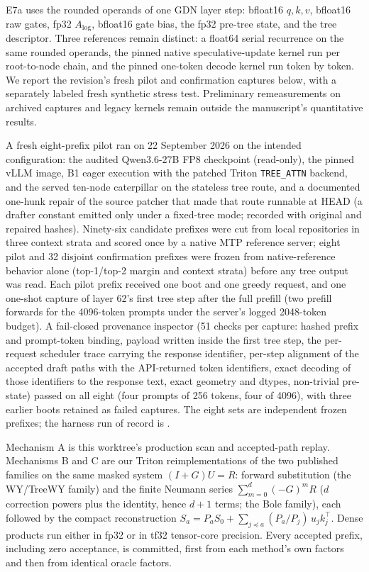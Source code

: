 \documentclass[conference]{IEEEtran}
\begin{document}
E7a uses the rounded operands of one GDN layer step: bfloat16 $q,k,v$, bfloat16 raw gates, fp32 $A_{\log}$, bfloat16 gate bias, the fp32 pre-tree state, and the tree descriptor. Three references remain distinct: a float64 serial recurrence on the same rounded operands, the pinned native speculative-update kernel run per root-to-node chain, and the pinned one-token decode kernel run token by token. We report the revision's fresh pilot and confirmation captures below, with a separately labeled fresh synthetic stress test. Preliminary remeasurements on archived captures and legacy kernels remain outside the manuscript's quantitative results.

A fresh eight-prefix pilot ran on 22 September 2026 on the intended configuration: the audited Qwen3.6-27B FP8 checkpoint (read-only), the pinned vLLM image, B1 eager execution with the patched Triton \texttt{TREE\_ATTN} backend, and the served ten-node caterpillar on the stateless tree route, and a documented one-hunk repair of the source patcher that made that route runnable at HEAD (a drafter constant emitted only under a fixed-tree mode; recorded with original and repaired hashes). Ninety-six candidate prefixes were cut from local repositories in three context strata and scored once by a native MTP reference server; eight pilot and 32 disjoint confirmation prefixes were frozen from native-reference behavior alone (top-1/top-2 margin and context strata) before any tree output was read. Each pilot prefix received one boot and one greedy request, and one one-shot capture of layer 62's first tree step after the full prefill (two prefill forwards for the 4096-token prompts under the server's logged 2048-token budget). A fail-closed provenance inspector (51 checks per capture: hashed prefix and prompt-token binding, payload written inside the first tree step, the per-request scheduler trace carrying the response identifier, per-step alignment of the accepted draft paths with the API-returned token identifiers, exact decoding of those identifiers to the response text, exact geometry and dtypes, non-trivial pre-state) passed on all eight (four prompts of 256 tokens, four of 4096), with three earlier boots retained as failed captures. The eight sets are independent frozen prefixes; the harness run of record is .

Mechanism A is this worktree's production scan and accepted-path replay. Mechanisms B and C are our Triton reimplementations of the two published families on the same masked system $(I+G)U=R$: forward substitution (the WY/TreeWY family) and the finite Neumann series $\sum_{m=0}^{d}(-G)^mR$ ($d$ correction powers plus the identity, hence $d+1$ terms; the Bole family), each followed by the compact reconstruction $S_a=P_aS_0+\sum_{j\preceq a}(P_a/P_j)\,u_jk_j^\top$. Dense products run either in fp32 or in tf32 tensor-core precision. Every accepted prefix, including zero acceptance, is committed, first from each method's own factors and then from identical oracle factors.
\end{document}
